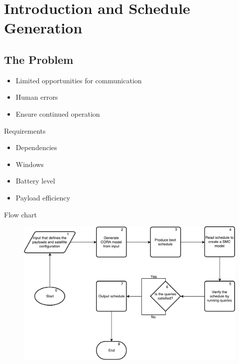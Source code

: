 \section{Introduction and Schedule Generation}
\subsection{The Problem}
\begin{frame}[fragile]{\insertsection}{\insertsubsection}
  \begin{itemize}
	\item Limited opportunities for communication 
	\item Human errors
	\item Ensure continued operation 
  \end{itemize}
\end{frame}

\begin{frame}[fragile]{Requirements}{\insertsubsection}
	\begin{itemize}
		\item Dependencies
		\item Windows
		\item Battery level
		\item Payload efficiency
	\end{itemize}
\end{frame}

\begin{frame}{Flow chart}{\insertsubsection}
	\begin{figure}
		\includegraphics[width=.8\textwidth]{graphics/flow_final.pdf}
	\end{figure}
\end{frame}


